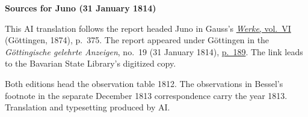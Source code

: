 \clearpage\thispagestyle{empty}
\begin{center}\textbf{Sources for Juno (31 January 1814)}\end{center}
\noindent This AI translation follows the report headed Juno in Gauss’s \href{https://gdz.sub.uni-goettingen.de/id/PPN236007467}{\textit{Werke}, vol.~VI} (Göttingen, 1874), p.~375. The report appeared under Göttingen in the \textit{Göttingische gelehrte Anzeigen}, no.~19 (31 January 1814), \href{https://api.digitale-sammlungen.de/iiif/image/v2/bsb10538685_00195/full/1600,/0/default.jpg}{p.~189}. The link leads to the Bavarian State Library’s digitized copy.
\par\smallskip\noindent Both editions head the observation table 1812. The observations in Bessel’s footnote in the separate December 1813 correspondence carry the year 1813. Translation and typesetting produced by AI.
\clearpage
